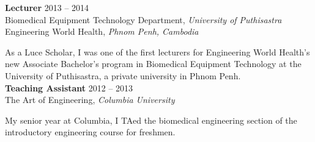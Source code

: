 \documentclass[10pt]{article}
\newenvironment{innerlist}[1][\enskip\textbullet]%
        {\begin{itemize}[#1,leftmargin=*,parsep=0pt,itemsep=0pt,topsep=0pt,partopsep=0pt]}
        {\end{itemize}}
\begin{document}


\textbf{Lecturer} \hfill {2013 -- 2014} \\
Biomedical Equipment Technology Department, \textit{University of Puthisastra} \\
Engineering World Health, \textit{Phnom Penh, Cambodia} 
  \vspace{0.08in}

As a Luce Scholar, I was one of the first lecturers for Engineering World Health's new Associate Bachelor’s program in Biomedical Equipment Technology at the University of Puthisastra, a private university in Phnom Penh.  \\



\textbf{Teaching Assistant} \hfill {2012 -- 2013} \\
The Art of Engineering, \textit{Columbia University} 
  \vspace{0.08in}

My senior year at Columbia, I TAed the biomedical engineering section of the introductory engineering course for freshmen. \\
\end{document}
